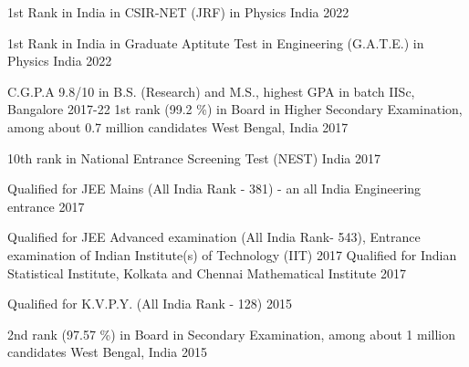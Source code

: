 




\begin{cvhonors}

 \cvhonor
{1st Rank in India} %
{in CSIR-NET (JRF) in Physics} %
{India} %
{2022} %

 \cvhonor
{1st Rank in India} %
{in Graduate Aptitute Test in Engineering (G.A.T.E.) in Physics} %
{India} %
{2022} %

  \cvhonor
{C.G.P.A} %
{9.8/10 in B.S. (Research) and M.S., highest GPA in batch} %
{IISc, Bangalore} %
{2017-22} %
  \cvhonor
    {1st rank (99.2 \%) in Board} %
    {in Higher Secondary Examination, among about 0.7 million candidates} %
    {West Bengal, India} %
    {2017} %

  \cvhonor
    {} %
    {10th rank in National Entrance Screening Test (NEST)} %
    {India} %
    {2017} %

  \cvhonor
	{} %
	{Qualified for JEE Mains (All India Rank - 381) - an all India Engineering entrance} %
	{} %
	{2017} %
	 
	\cvhonor
	{} %
	{Qualified for JEE Advanced examination (All India Rank- 543), Entrance examination of Indian Institute(s) of Technology (IIT)} %
	{} %
	{2017} %
  \cvhonor
    {} %
    {Qualified for Indian Statistical Institute, Kolkata and Chennai Mathematical Institute} %
    {} %
    {2017} %

  \cvhonor
    {} %
    {Qualified for K.V.P.Y. (All India Rank - 128)} %
    {} %
    {2015} %

  \cvhonor
    {2nd rank (97.57 \%) in Board} %
    {in Secondary Examination, among about 1 million candidates} %
    {West Bengal, India} %
    {2015} %

\end{cvhonors}

